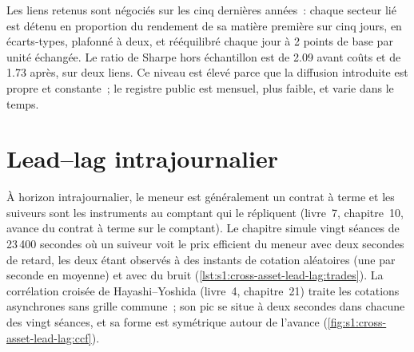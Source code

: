 Les liens retenus sont négociés sur les cinq dernières années~: chaque secteur lié est détenu en proportion du rendement de sa matière première sur cinq jours, en écarts-types,
plafonné à deux, et rééquilibré chaque jour à 2 points de base par unité échangée. Le ratio de Sharpe hors échantillon est de 2.09 avant coûts et de 1.73 après, sur deux liens. Ce
niveau est élevé parce que la diffusion introduite est propre et constante~; le registre public est mensuel, plus faible, et varie dans le temps.

\section{Lead--lag intrajournalier}

À horizon intrajournalier, le meneur est généralement un contrat à terme et les suiveurs sont les instruments au comptant qui le répliquent (livre~7, chapitre~10,
avance du contrat à terme sur le comptant). Le chapitre simule vingt séances de 23\,400 secondes où un suiveur voit le prix efficient du meneur avec deux secondes de retard,
les deux étant observés à des instants de cotation aléatoires (une par seconde en moyenne) et avec du bruit (\cref{lst:s1:cross-asset-lead-lag:trades}). La corrélation croisée de Hayashi--Yoshida
(livre~4, chapitre~21) traite les cotations asynchrones sans grille commune~; son pic se situe à deux secondes dans chacune des vingt
séances, et sa forme est symétrique autour de l'avance (\cref{fig:s1:cross-asset-lead-lag:ccf}).

\begin{omfigure}

\label{fig:s1:cross-asset-lead-lag:ccf}
\end{omfigure}

